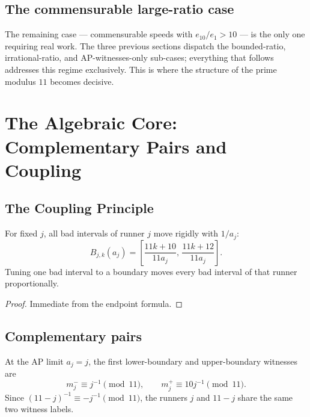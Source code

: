 \documentclass[12pt]{article}
\begin{document}
\subsection{The commensurable large-ratio case}

The remaining case --- commensurable speeds with $e_{10}/e_1>10$ --- is the only one requiring
real work. The three previous sections dispatch the bounded-ratio, irrational-ratio, and
AP-witnesses-only sub-cases; everything that follows addresses this regime exclusively.
This is where the structure of the prime modulus $11$ becomes decisive.



\section{The Algebraic Core: Complementary Pairs and Coupling}

\subsection{The Coupling Principle}

\begin{lemma}\label{l:41}
For fixed $j$, all bad intervals of runner $j$ move
rigidly with $1/a_j$:
\[
B_{j,k}(a_j) = \left[\frac{11k+10}{11a_j},\,\frac{11k+12}{11a_j}\right].
\]
Tuning one bad interval to a boundary moves every bad interval of that runner
proportionally.

\end{lemma}
\begin{proof}
Immediate from the endpoint formula.
\end{proof}

\subsection{Complementary pairs}

At the AP limit $a_j=j$, the first lower-boundary and upper-boundary witnesses are
\[
m_j^- \equiv j^{-1}\pmod{11},\qquad m_j^+ \equiv 10j^{-1}\pmod{11}.
\]
Since $(11-j)^{-1}\equiv -j^{-1}\pmod{11}$, the runners $j$ and $11-j$ share the same
two witness labels.
\end{document}
